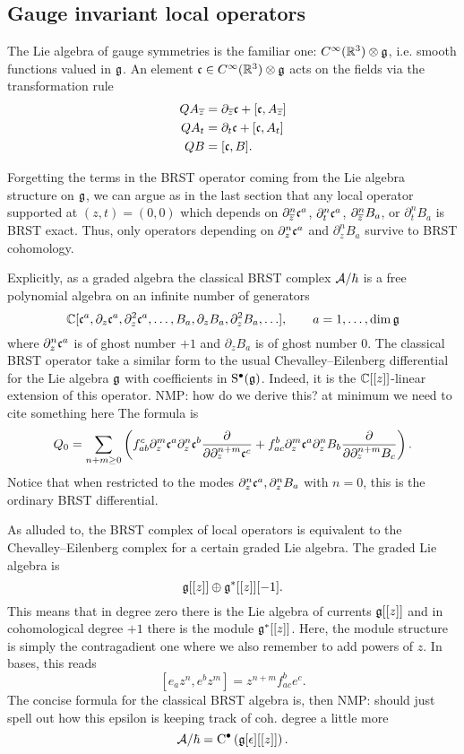 \documentclass[11pt]{amsart}
\def\natalie#1{{\textcolor{green!65!black}{NMP: {#1}}}}
\begin{document}
\subsection{Gauge invariant local operators}

The Lie algebra of gauge symmetries is the familiar one: $C^\infty(\mathbb R^3) \otimes \mathfrak g$, i.e. smooth functions valued in $\mathfrak g$. 
An element $\mathfrak c \in C^\infty(\mathbb R^3) \otimes \mathfrak g$ acts on the fields via the transformation rule
\begin{align*}
Q A_{\overline{z}} & = \partial_{{\overline{z}}} \mathfrak c + [\mathfrak c, A_{\overline{z}}] \\
Q A_t & = \partial_t \mathfrak c + [\mathfrak c,A_t] \\
Q B & = [\mathfrak c, B] .
\end{align*}

Forgetting the terms in the BRST operator coming from the Lie algebra structure on $\mathfrak g$, we can argue as in the last section that any local operator supported at $(z,t) = (0,0)$ which depends on $\partial^n_{{\overline{z}}} \mathfrak c^a$, $\partial^n_t \mathfrak c^a$, $\partial^n_{{\overline{z}}} B_a$, or $\partial^n_t B_a$ is BRST exact. 
Thus, only operators depending on $\partial_z^n \mathfrak c^a$ and $\partial^n_z B_a$ survive to BRST cohomology.

Explicitly, as a graded algebra the classical BRST complex $\mathcal A / \hbar$ is a free polynomial algebra on an infinite number of generators
\[
\mathbb C[\mathfrak c^a, \partial_z \mathfrak c^a , \partial^2_z \mathfrak c^a, \ldots, B_a , \partial_z B_a , \partial_z^2 B_a, \ldots], \qquad {a=1, \ldots, \dim \mathfrak g} 
\]
where $\partial_z^n \mathfrak c^a$ is of ghost number $+1$ and $\partial_z B_a$ is of ghost number $0$. 
The classical BRST operator take a similar form to the usual Chevalley--Eilenberg differential for the Lie algebra $\mathfrak g$ with coefficients in ${\rm S}^\bullet (\mathfrak g)$. 
Indeed, it is the $\mathbb C[[z]]$-linear extension of this operator. \natalie{how do we derive this? at minimum we need to cite something here}
The formula is
\[
Q_0 = \sum_{n +m \geq 0} \left(f_{ab}^c \partial_z^m \mathfrak c^a \partial_z^n \mathfrak c^b \frac{\partial}{\partial \partial_z^{n+m}\mathfrak c^c} + f_{ac}^b \partial_{z}^m \mathfrak c^a \partial_z^n B_b \frac{\partial}{\partial \partial_z^{n+m} B_c}\right) .
\] 
Notice that when restricted to the modes $\partial_z^n \mathfrak c^a, \partial_z^n B_a$ with $n=0$, this is the ordinary BRST differential. 

As alluded to, the BRST complex of local operators is equivalent to the Chevalley--Eilenberg complex for a certain graded Lie algebra.
The graded Lie algebra is
\[
\mathfrak g[[z]] \oplus \mathfrak g^*[[z]] [-1] .
\]
This means that in degree zero there is the Lie algebra of currents $\mathfrak g[[z]]$ and in cohomological degree $+1$ there is the module $\mathfrak g^*[[z]]$. 
Here, the module structure is simply the contragadient one where we also remember to add powers of $z$.
In bases, this reads
\[
[e_a z^n , e^b z^m] = z^{n+m} f_{ac}^{b} e^c  .
\]
The concise formula for the classical BRST algebra is, then \natalie{should just spell out how this epsilon is keeping track of coh. degree a little more}
\[
\mathcal A / \hbar = {\rm C}^\bullet \left(\mathfrak g[\epsilon][[z]]\right) .
\] 
\end{document}
